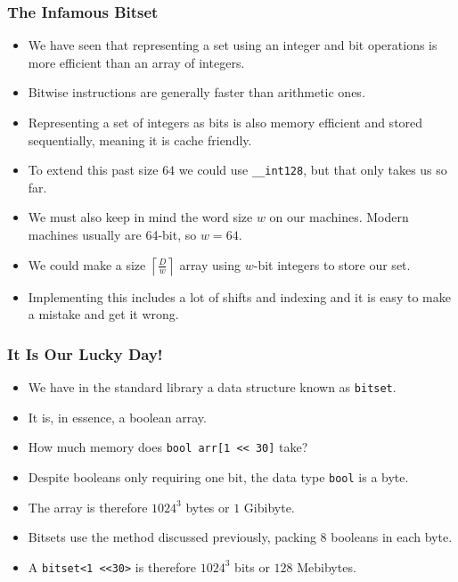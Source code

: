 \documentclass[10pt]{beamer}
\begin{document}
\begin{frame}
    \frametitle{The Infamous Bitset}
    \begin{itemize}
        \item We have seen that representing a set using an integer and bit operations is more efficient than an array of integers.
        \item<2-> Bitwise instructions are generally faster than arithmetic ones.
        \item<3-> Representing a set of integers as bits is also memory efficient and stored sequentially, meaning it is cache friendly.
        \item<4-> To extend this past size $64$ we could use \texttt{\_\_int128}, but that only takes us so far.
        \item<5-> We must also keep in mind the word size $w$ on our machines. Modern machines usually are 64-bit, so $w=64$.
        \item<6-> We could make a size $\left\lceil \frac{D}{w} \right\rceil$ array using $w$-bit integers to store our set.
        \item<7-> Implementing this includes a lot of shifts and indexing and it is easy to make a mistake and get it wrong.
    \end{itemize}
\end{frame}

\begin{frame}
    \frametitle{It Is Our Lucky Day!}
    \begin{itemize}
        \item We have in the standard library a data structure known as \texttt{bitset}.
        \item<2-> It is, in essence, a boolean array.
        \item<3-> How much memory does \texttt{bool arr[1 << 30]} take?
        \item<4-> Despite booleans only requiring one bit, the data type \texttt{bool} is a byte.
        \item<5-> The array is therefore $1024^3$ bytes or $1$ Gibibyte.
        \item<6-> Bitsets use the method discussed previously, packing $8$ booleans in each byte.
        \item<7-> A \texttt{bitset<1 \textless\textless 30>} is therefore $1024^3$ bits or $128$ Mebibytes.
    \end{itemize}
\end{frame}
\end{document}
